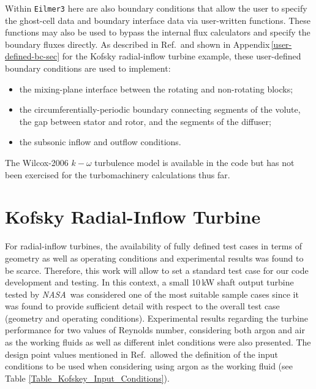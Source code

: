 \documentclass[12pt,a4paper,twoside]{article}
\begin{document}
Within \texttt{Eilmer3} here are also boundary conditions that allow the user 
to specify the ghost-cell data and boundary interface data via user-written functions.
These functions may also be used to bypass the internal flux calculators and specify the boundary
fluxes directly.
As described in Ref.\,\cite{van_der_Laan_2009} and shown in Appendix\,\ref{user-defined-bc-sec} 
for the Kofsky radial-inflow turbine example, 
these user-defined boundary conditions are used to implement:
\begin{itemize}
 \item the mixing-plane interface between the rotating and non-rotating blocks;
 \item the circumferentially-periodic boundary connecting segments of the volute,
    the gap between stator and rotor, and the segments of the diffuser;
 \item the subsonic inflow and outflow conditions.
\end{itemize}
The Wilcox-2006 $k-\omega$ turbulence model is available in the code but has not been exercised 
for the turbomachinery calculations thus far.

\cleardoublepage

\section{Kofsky Radial-Inflow Turbine}
\label{sec:kofsky_example}
%
For radial-inflow turbines, the availability of fully defined test cases in terms of geometry as well as operating conditions and experimental results was found to be scarce.
Therefore, this work will allow to set a standard test case for our code development and testing.
In this context, a small 10\,kW shaft output turbine tested by \textit{NASA}\,\cite{Kofskey_1966} was considered one of the most suitable sample cases since it was found to provide sufficient detail with respect to the overall test case (geometry and operating conditions). 
Experimental results regarding the turbine performance for two values of Reynolds number, considering both argon and air as the working fluids as well as different inlet conditions were also presented.
The design point values mentioned in Ref.\,\cite{Kofskey_1966} allowed the definition of the input conditions to be used
when considering using argon as the working fluid (see Table \ref{Table_Kofskey_Input_Conditions}).
\end{document}

